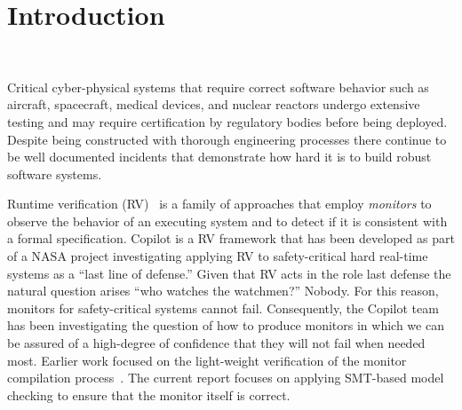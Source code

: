 \section{Introduction}~\label{sec:intro}





Critical cyber-physical systems that require correct software behavior
such as aircraft, spacecraft, medical devices, and nuclear reactors
undergo extensive testing and may require certification by regulatory
bodies before being deployed. Despite being constructed with thorough
engineering processes there continue to be well documented incidents
that demonstrate how hard it is to build robust software systems.


Runtime verification (RV)~\cite{KimVBKLS99, monitors} is a family of
approaches that employ {\em monitors} to observe the behavior of an
executing system and to detect if it is consistent with a formal
specification. Copilot is a RV framework that has been developed as
part of a NASA project investigating applying RV to safety-critical
hard real-time systems as a ``last line of defense.''  Given that RV
acts in the role last defense  the natural question arises
``who watches the watchmen?''  Nobody. For this reason, monitors for
safety-critical systems cannot fail.  Consequently, the Copilot team
has been investigating the question of how to produce monitors in
which we can be assured of a high-degree of confidence that they will
not fail when needed most. Earlier work focused on the light-weight
verification of the monitor compilation
process~\cite{pike-icfp-12}. The current report focuses on applying
SMT-based model checking to ensure that the monitor itself is correct. 


  